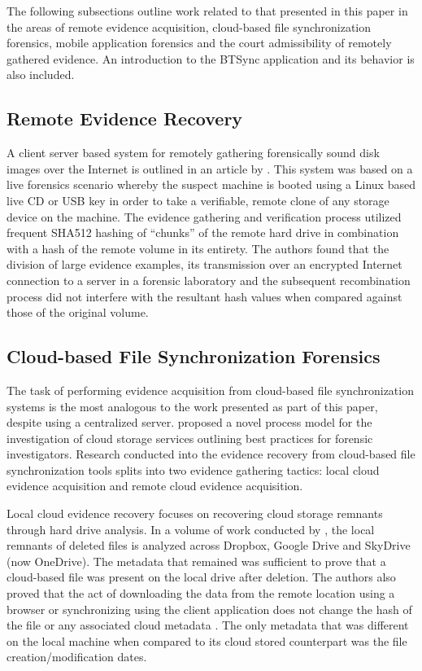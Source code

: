 \documentclass{jdfsl}
\begin{document}
The following subsections outline work related to that presented in this paper in the areas of remote evidence acquisition, cloud-based file synchronization forensics, mobile application forensics and the court admissibility of remotely gathered evidence. An introduction to the BTSync application and its behavior is also included.\\

\subsection{Remote Evidence Recovery}

A client server based system for remotely gathering forensically sound disk images over the Internet is outlined in an article by \citet{scanlon2010online}. This system was based on a live forensics scenario whereby the suspect machine is booted using a Linux based live CD or USB key in order to take a verifiable, remote clone of any storage device on the machine. The evidence gathering and verification process utilized frequent SHA512 hashing of ``chunks'' of the remote hard drive in combination with a hash of the remote volume in its entirety. The authors found that the division of large evidence examples, its transmission over an encrypted Internet connection to a server in a forensic laboratory and the subsequent recombination process did not interfere with the resultant hash values when compared against those of the original volume.\\

\subsection{Cloud-based File Synchronization Forensics}
\label{cloudforensics}
The task of performing evidence acquisition from cloud-based file synchronization systems is the most analogous to the work presented as part of this paper, despite using a centralized server. \citet{chung2012digital} proposed a novel process model for the investigation of cloud storage services outlining best practices for forensic investigators. Research conducted into the evidence recovery from cloud-based file synchronization tools splits into two evidence gathering tactics: local cloud evidence acquisition and remote cloud evidence acquisition. 

Local cloud evidence recovery focuses on recovering cloud storage remnants through hard drive analysis. In a volume of work conducted by \citet{quick2012masters}, the local remnants of deleted files is analyzed across Dropbox, Google Drive and SkyDrive (now OneDrive). The metadata that remained was sufficient to prove that a cloud-based file was present on the local drive after deletion. The authors also proved that the act of downloading the data from the remote location using a browser or synchronizing using the client application does not change the hash of the file or any associated cloud metadata \citep{Quick2013266}. The only metadata that was different on the local machine when compared to its cloud stored counterpart was the file creation/modification dates.
\end{document}
